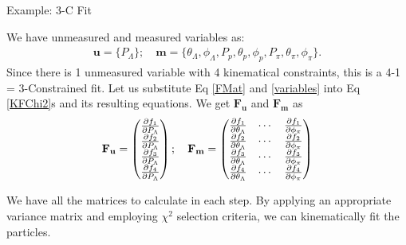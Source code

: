 \documentclass[
	xcolor=dvipsnames,
	10pt, 
	]{beamer}
\begin{document}
\begin{frame}{Example: 3-C Fit}
	\begin{block}{}
		We have unmeasured and measured variables as:
		\begin{align}
			\mathbf{u} = \{P_\Lambda\};\quad \mathbf{m}=\{\theta_\Lambda,\phi_\Lambda,P_p,\theta_p,\phi_p,P_\pi,\theta_\pi,\phi_\pi\}.\label{variables}
		\end{align}		
		Since there is 1 unmeasured variable with 4 kinematical constraints, this is a 4-1 = 3-Constrained fit. Let us substitute Eq \eqref{FMat} and \eqref{variables} into Eq \eqref{KFChi2}s and its resulting equations. We get $\mathbf{F_u}$ and $\mathbf{F_m}$ as
		\begin{align}
			\mathbf{F_u}=
			\begin{pmatrix}
				\frac{\partial f_1}{\partial P_\Lambda}\\
				\frac{\partial f_2}{\partial P_\Lambda}\\
				\frac{\partial f_3}{\partial P_\Lambda}\\
				\frac{\partial f_4}{\partial P_\Lambda}
			\end{pmatrix};\quad \mathbf{F_m}=\begin{pmatrix}
			\frac{\partial f_1}{\partial \theta_\Lambda} &\cdots&\frac{\partial f_1}{\partial \phi_\pi} \\
			\frac{\partial f_2}{\partial \theta_\Lambda} &\cdots&\frac{\partial f_2}{\partial \phi_\pi}\\
			\frac{\partial f_3}{\partial \theta_\Lambda} &\cdots&\frac{\partial f_3}{\partial \phi_\pi}\\
			\frac{\partial f_4}{\partial \theta_\Lambda} &\cdots&\frac{\partial f_4}{\partial \phi_\pi}
			\end{pmatrix}
		\end{align}
		\begin{adjustwidth}{13mm}{}{
		We have all the matrices to calculate in each step. By applying an appropriate variance matrix and employing $\chi^2$ selection criteria, we can kinematically fit the particles.}
		\end{adjustwidth}
	\end{block}
\end{frame}
\end{document}

